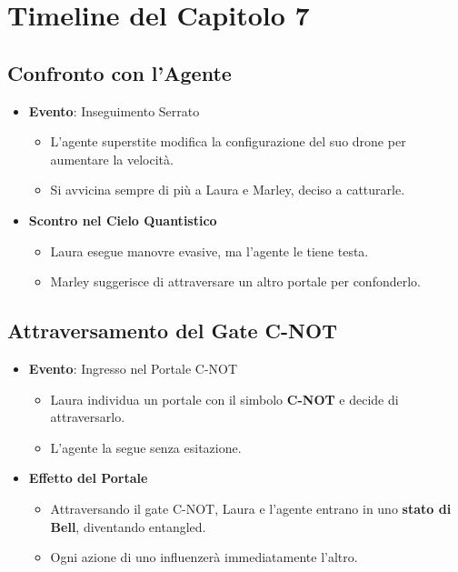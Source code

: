 \section*{Timeline del Capitolo 7}

\subsection*{Confronto con l'Agente}

\begin{itemize}
    \item \textbf{Evento}: Inseguimento Serrato
    \begin{itemize}
        \item L'agente superstite modifica la configurazione del suo drone per aumentare la velocità.
        \item Si avvicina sempre di più a Laura e Marley, deciso a catturarle.
    \end{itemize}

    \item \textbf{Scontro nel Cielo Quantistico}
    \begin{itemize}
        \item Laura esegue manovre evasive, ma l'agente le tiene testa.
        \item Marley suggerisce di attraversare un altro portale per confonderlo.
    \end{itemize}
\end{itemize}

\subsection*{Attraversamento del Gate C-NOT}

\begin{itemize}
    \item \textbf{Evento}: Ingresso nel Portale C-NOT
    \begin{itemize}
        \item Laura individua un portale con il simbolo \textbf{C-NOT} e decide di attraversarlo.
        \item L'agente la segue senza esitazione.
    \end{itemize}

    \item \textbf{Effetto del Portale}
    \begin{itemize}
        \item Attraversando il gate C-NOT, Laura e l'agente entrano in uno \textbf{stato di Bell}, diventando entangled.
        \item Ogni azione di uno influenzerà immediatamente l'altro.
    \end{itemize}
\end{itemize}


